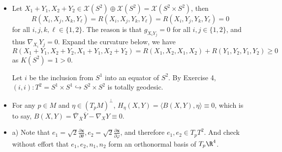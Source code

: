\begin{itemize}
    \item[5.] Let $X_1+Y_1,X_2+Y_2\in\mathscr{X}(S^2)\oplus\mathscr{X}(S^2)
    =\mathscr{X}(S^2 \times S^2)$, then
    \[R(X_i,X_j,X_k,Y_\ell)=R(X_i,X_j,Y_k,Y_\ell)=R(X_i,Y_j,Y_k,Y_\ell)=0\]
    for all $i,j,k,\ell\in\{1,2\}$. 
    The reason is that $g_{X_iY_j}=0$ for all $i,j\in\{1,2\}$, 
    and thus $\nabla_{X_i}Y_j=0$. Expand the curvature below, we have
    \[R(X_1+Y_1,X_2+Y_2,X_1+Y_1,X_2+Y_2)
    =R(X_1,X_2,X_1,X_2)+R(Y_1,Y_2,Y_1,Y_2)\ge0\]
    as $K(S^2)=1>0$.

    Let $i$ be the inclusion from $S^1$ into an equator of $S^2$. 
    By Exercise 4, $(i,i)\colon T^2=S^1 \times S^1 \hookrightarrow 
    S^2 \times S^2$ is totally geodesic.

    \item[7.] For any $p\in M$ and $\eta\in(T_pM)^\perp$, 
    $H_\eta(X,Y)=\langle B(X,Y),\eta \rangle\equiv0$, which is to say, 
    $B(X,Y)=\overline{\nabla}_{\overline{X}}\overline{Y}-\nabla_XY\equiv0$.

    \item[8.] a) Note that $e_1=\sqrt{2}\frac{\partial\mathbf{x}}{\partial\theta},
    e_2=\sqrt{2}\frac{\partial\mathbf{x}}{\partial\varphi}$, 
    and therefore $e_1,e_2\in T_pT^2$. 
    And check without effort that $e_1,e_2,n_1,n_2$ 
    form an orthonormal basis of $T_p\R^4$.


\end{itemize}

